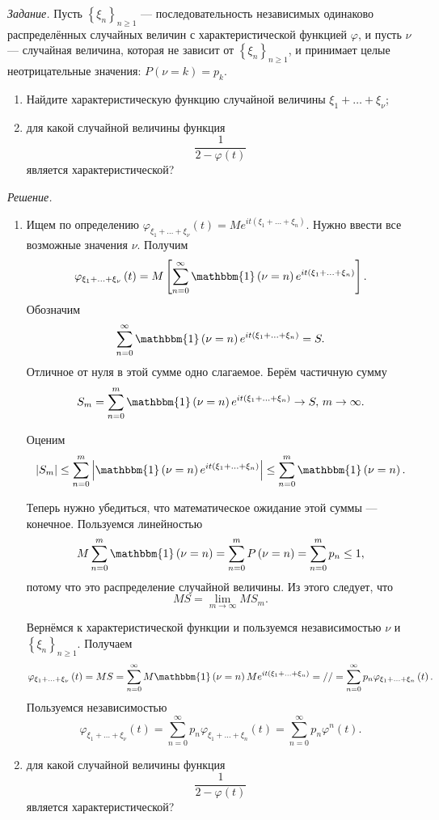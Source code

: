 \textit{Задание.}
Пусть $ \left\{ \xi_n \right\}_{n \geq 1}$ --- последовательность независимых одинаково распределённых случайных величин с характеристической функцией $ \varphi $,
и пусть $ \nu $ --- случайная величина, которая не зависит от $ \left\{ \xi_n \right\}_{n \geq 1}$,
и принимает целые неотрицательные значения: $P \left( \nu = k \right) = p_k$.
\begin{enumerate}[label=\alph*)]
\item Найдите характеристическую функцию случайной величины $ \xi_1 + \dotsc + \xi_{ \nu }$;
\item для какой случайной величины функция
$$ \frac{1}{2 - \varphi \left( t \right) }$$
является характеристической?
\end{enumerate}

\textit{Решение.}
\begin{enumerate}[label=\alph*)]
\item Ищем по определению $ \varphi_{ \xi_1 + \dotsc + \xi_{ \nu }} \left( t \right) = Me^{it \left( \xi_1 + \dotsc + \xi_n \right) }$.
Нужно ввести все возможные значения $ \nu $.
Получим
$$ \varphi_{ \xi_1 + \dotsc + \xi_{ \nu }} \left( t \right) =
M \left[ \sum \limits_{n=0}^{ \infty } \mathbbm{1} \left( \nu = n \right) e^{it \left( \xi_1 + \dotsc + \xi_n \right) } \right].$$
Обозначим
$$ \sum \limits_{n=0}^{ \infty } \mathbbm{1} \left( \nu = n \right) e^{it \left( \xi_1 + \dotsc + \xi_n \right) } = S.$$
Отличное от нуля в этой сумме одно слагаемое.
Берём частичную сумму
$$S_m =
\sum \limits_{n=0}^m \mathbbm{1} \left( \nu = n \right) e^{it \left( \xi_1 + \dotsc + \xi_n \right) } \rightarrow S, \, m \rightarrow \infty.$$

Оценим
$$ \left| S_m \right| \leq
\sum \limits_{n=0}^m \left| \mathbbm{1} \left( \nu = n \right) e^{it \left( \xi_1 + \dotsc + \xi_n \right) } \right| \leq
\sum \limits_{n=0}^m \mathbbm{1} \left( \nu = n \right).$$

Теперь нужно убедиться, что математическое ожидание этой суммы --- конечное.
Пользуемся линейностью
$$M \sum \limits_{n=0}^m \mathbbm{1} \left( \nu = n \right) =
\sum \limits_{n=0}^m P \left( \nu = n \right) =
\sum \limits_{n=0}^m p_n \leq
1,$$
потому что это распределение случайной величины.
Из этого следует, что
$$MS = \lim \limits_{m \to \infty } MS_m.$$

Вернёмся к характеристической функции и пользуемся независимостью $ \nu $ и $ \left\{ \xi_n \right\}_{n \geq 1}$.
Получаем
\begin{equation*}
\varphi_{ \xi_1 + \dotsc + \xi_{ \nu }} \left( t \right) =
MS =
\sum \limits_{n=0}^{ \infty } M \mathbbm{1} \left( \nu = n \right) Me^{it \left( \xi_1 + \dotsc + \xi_n \right) } = //
= \sum \limits_{n=0}^{ \infty } p_n \varphi_{ \xi_1 + \dotsc + \xi_n} \left( t \right).
\end{equation*}
Пользуемся независимостью
$$ \varphi_{ \xi_1 + \dotsc + \xi_{ \nu }} \left( t \right) =
\sum \limits_{n=0}^{ \infty } p_n \varphi_{ \xi_1 + \dotsc + \xi_n} \left( t \right) =
\sum \limits_{n=0}^{ \infty } p_n \varphi^n \left( t \right).$$
\item для какой случайной величины функция
$$ \frac{1}{2 - \varphi \left( t \right) }$$
является характеристической?
\end{enumerate}
